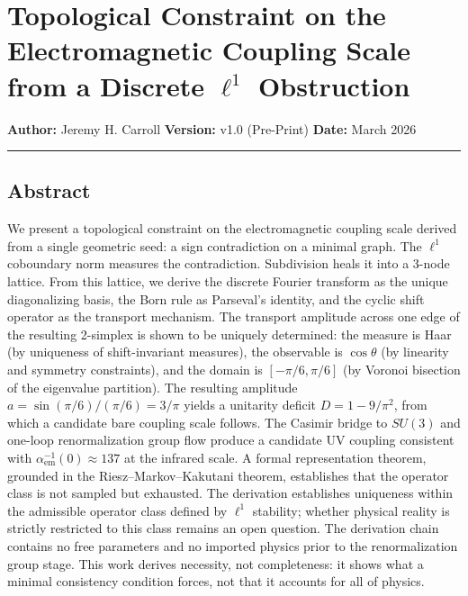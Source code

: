 \documentclass[
]{article}
\author{}
\date{}
\begin{document}
\hypertarget{topological-constraint-on-the-electromagnetic-coupling-scale-from-a-discrete-ell1-obstruction}{%
\section{\texorpdfstring{Topological Constraint on the Electromagnetic
Coupling Scale from a Discrete \(\ell^1\)
Obstruction}{Topological Constraint on the Electromagnetic Coupling Scale from a Discrete \textbackslash ell\^{}1 Obstruction}}\label{topological-constraint-on-the-electromagnetic-coupling-scale-from-a-discrete-ell1-obstruction}}

\textbf{Author:} Jeremy H. Carroll \textbf{Version:} v1.0 (Pre-Print)
\textbf{Date:} March 2026

\begin{center}\rule{0.5\linewidth}{0.5pt}\end{center}

\hypertarget{abstract}{%
\subsection{Abstract}\label{abstract}}

We present a topological constraint on the electromagnetic coupling
scale derived from a single geometric seed: a sign contradiction on a
minimal graph. The \(\ell^1\) coboundary norm measures the
contradiction. Subdivision heals it into a 3-node lattice. From this
lattice, we derive the discrete Fourier transform as the unique
diagonalizing basis, the Born rule as Parseval's identity, and the
cyclic shift operator as the transport mechanism. The transport
amplitude across one edge of the resulting 2-simplex is shown to be
uniquely determined: the measure is Haar (by uniqueness of
shift-invariant measures), the observable is \(\cos\theta\) (by
linearity and symmetry constraints), and the domain is
\([-\pi/6, \pi/6]\) (by Voronoi bisection of the eigenvalue partition).
The resulting amplitude \(a = \sin(\pi/6)/(\pi/6) = 3/\pi\) yields a
unitarity deficit \(D = 1 - 9/\pi^2\), from which a candidate bare
coupling scale follows. The Casimir bridge to \(SU(3)\) and one-loop
renormalization group flow produce a candidate UV coupling consistent
with \(\alpha_{\mathrm{em}}^{-1}(0) \approx 137\) at the infrared scale.
A formal representation theorem, grounded in the Riesz--Markov--Kakutani
theorem, establishes that the operator class is not sampled but
exhausted. The derivation establishes uniqueness within the admissible
operator class defined by \(\ell^1\) stability; whether physical reality
is strictly restricted to this class remains an open question. The
derivation chain contains no free parameters and no imported physics
prior to the renormalization group stage. This work derives necessity,
not completeness: it shows what a minimal consistency condition forces,
not that it accounts for all of physics.
\end{document}
